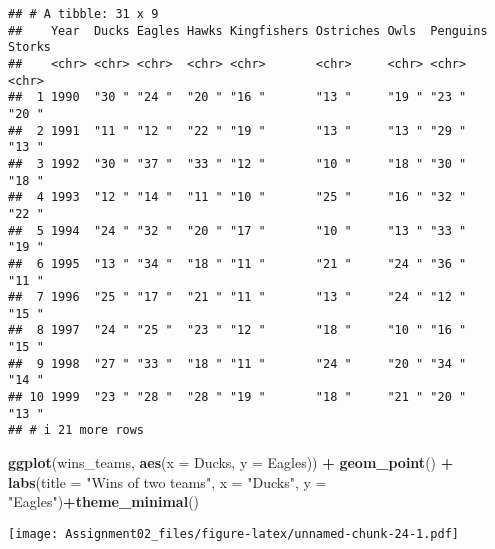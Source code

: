 \documentclass[
]{article}
\newenvironment{Shaded}{\begin{snugshade}}{\end{snugshade}}
\newcommand{\AttributeTok}[1]{\textcolor[rgb]{0.13,0.29,0.53}{#1}}
\newcommand{\FunctionTok}[1]{\textcolor[rgb]{0.13,0.29,0.53}{\textbf{#1}}}
\newcommand{\NormalTok}[1]{#1}
\newcommand{\SpecialCharTok}[1]{\textcolor[rgb]{0.81,0.36,0.00}{\textbf{#1}}}
\newcommand{\StringTok}[1]{\textcolor[rgb]{0.31,0.60,0.02}{#1}}
\begin{document}
\begin{verbatim}
## # A tibble: 31 x 9
##    Year  Ducks Eagles Hawks Kingfishers Ostriches Owls  Penguins Storks
##    <chr> <chr> <chr>  <chr> <chr>       <chr>     <chr> <chr>    <chr> 
##  1 1990  "30 " "24 "  "20 " "16 "       "13 "     "19 " "23 "    "20 " 
##  2 1991  "11 " "12 "  "22 " "19 "       "13 "     "13 " "29 "    "13 " 
##  3 1992  "30 " "37 "  "33 " "12 "       "10 "     "18 " "30 "    "18 " 
##  4 1993  "12 " "14 "  "11 " "10 "       "25 "     "16 " "32 "    "22 " 
##  5 1994  "24 " "32 "  "20 " "17 "       "10 "     "13 " "33 "    "19 " 
##  6 1995  "13 " "34 "  "18 " "11 "       "21 "     "24 " "36 "    "11 " 
##  7 1996  "25 " "17 "  "21 " "11 "       "13 "     "24 " "12 "    "15 " 
##  8 1997  "24 " "25 "  "23 " "12 "       "18 "     "10 " "16 "    "15 " 
##  9 1998  "27 " "33 "  "18 " "11 "       "24 "     "20 " "34 "    "14 " 
## 10 1999  "23 " "28 "  "28 " "19 "       "18 "     "21 " "20 "    "13 " 
## # i 21 more rows
\end{verbatim}

\begin{Shaded}
\begin{Highlighting}[]
\FunctionTok{ggplot}\NormalTok{(wins\_teams, }\FunctionTok{aes}\NormalTok{(}\AttributeTok{x =}\NormalTok{ Ducks, }\AttributeTok{y =}\NormalTok{ Eagles)) }\SpecialCharTok{+}
  \FunctionTok{geom\_point}\NormalTok{() }\SpecialCharTok{+}
  \FunctionTok{labs}\NormalTok{(}\AttributeTok{title =} \StringTok{"Wins of two teams"}\NormalTok{,}
       \AttributeTok{x =} \StringTok{"Ducks"}\NormalTok{,}
       \AttributeTok{y =} \StringTok{"Eagles"}\NormalTok{)}\SpecialCharTok{+}\FunctionTok{theme\_minimal}\NormalTok{()}
\end{Highlighting}
\end{Shaded}

\texttt{[image: Assignment02\_files/figure-latex/unnamed-chunk-24-1.pdf]}
\end{document}

